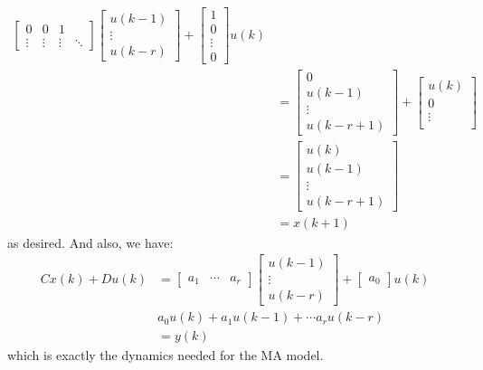 \documentclass[12pt]{exam}
\begin{document}
\begin{questions}
\begin{solution}
\begin{align*}
\begin{bmatrix}
      0 & 0 & 1 \\
      \vdots & \vdots & \vdots & \ddots
    \end{bmatrix}
  \begin{bmatrix}
    u(k-1) \\
    \vdots \\
     u(k-r)
  \end{bmatrix} + 
  \begin{bmatrix}
      1 \\
      0 \\
      \vdots \\
      0
    \end{bmatrix}
    u(k) \\
  &=
  \begin{bmatrix}
    0 \\
    u(k - 1) \\
    \vdots \\
    u(k - r + 1)
  \end{bmatrix} + 
  \begin{bmatrix}
    u(k) \\
    0 \\
    \vdots \\
  \end{bmatrix} \tag{Definition of matrix multiplication} \\
  &= \begin{bmatrix}
    u(k) \\
    u(k - 1) \\
    \vdots \\
    u(k - r + 1)
  \end{bmatrix} \tag{$A$ shifts the input down to make space for latest signal from $B$} \\
  &= x(k + 1)
\end{align*}
as desired. And also, we have:
\begin{align*}
  Cx(k) + Du(k) &=
  \begin{bmatrix}
    a_1 & \cdots & a_r
  \end{bmatrix}
  \begin{bmatrix}
    u(k-1) \\
    \vdots \\
    u(k-r)
  \end{bmatrix} + 
  \begin{bmatrix}
    a_0
  \end{bmatrix}
  u(k) \\
  & a_0 u(k) + a_1u(k-1) + \cdots a_r u(k-r) \tag{Matrix multiplication} \\
  &= y(k)
\end{align*}
which is exactly the dynamics needed for the MA model.


\end{solution}
\end{questions}
\end{document}
